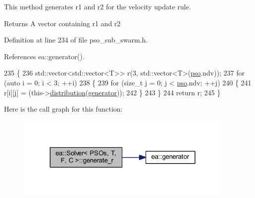 This method generates r1 and r2 for the velocity update rule. 

\begin{DoxyReturn}{Returns}
A vector containing r1 and r2 
\end{DoxyReturn}


Definition at line 234 of file pso\+\_\+sub\+\_\+swarm.\+h.



References ea\+::generator().


\begin{DoxyCode}
235     \{
236         std::vector<std::vector<T>> r(3, std::vector<T>(\hyperlink{classea_1_1_solver_3_01_p_s_os_00_01_t_00_01_f_00_01_c_01_4_a1f1aa62756a73565ebe0ca1fbc084ea5}{pso}.ndv));
237         \textcolor{keywordflow}{for} (\textcolor{keyword}{auto} i = 0; i < 3; ++i)
238         \{
239             \textcolor{keywordflow}{for} (\textcolor{keywordtype}{size\_t} j = 0; j < \hyperlink{classea_1_1_solver_3_01_p_s_os_00_01_t_00_01_f_00_01_c_01_4_a1f1aa62756a73565ebe0ca1fbc084ea5}{pso}.ndv; ++j)
240             \{
241                 r[i][j] = (this->\hyperlink{classea_1_1_solver__base_ae88f44b13e264e092d3bbaeca6b3bd19}{distribution}(\hyperlink{namespaceea_a385e8ca8ba4ae2f69dcfffa79f20c2ff}{generator}));
242             \}
243         \}
244         \textcolor{keywordflow}{return} r;
245     \}
\end{DoxyCode}
Here is the call graph for this function\+:
\nopagebreak
\begin{figure}[H]
\begin{center}
\leavevmode
\includegraphics[width=299pt]{classea_1_1_solver_3_01_p_s_os_00_01_t_00_01_f_00_01_c_01_4_a01ea94eec2b6f05c62c9f83d725bb75b_cgraph}
\end{center}
\end{figure}
\mbox{\label{classea_1_1_solver_3_01_p_s_os_00_01_t_00_01_f_00_01_c_01_4_a91feb28b5a3b292da8eedb1f782d53c0}} 
